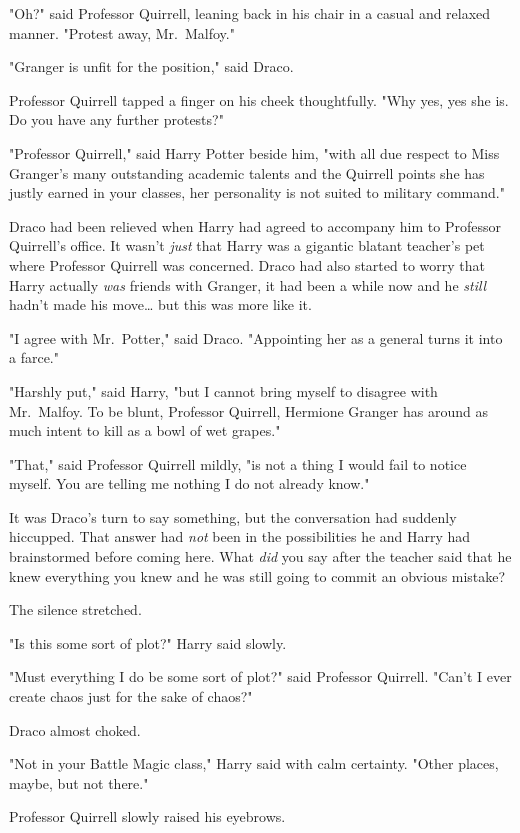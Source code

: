 "Oh?" said Professor Quirrell, leaning back in his chair in a casual and 
relaxed manner. "Protest away, Mr.~Malfoy."

"Granger is unfit for the position," said Draco.

Professor Quirrell tapped a finger on his cheek thoughtfully. "Why yes, yes she 
is. Do you have any further protests?"

"Professor Quirrell," said Harry Potter beside him, "with all due respect to 
Miss Granger's many outstanding academic talents and the Quirrell points she 
has justly earned in your classes, her personality is not suited to military 
command."

Draco had been relieved when Harry had agreed to accompany him to Professor 
Quirrell's office. It wasn't \emph{just} that Harry was a gigantic blatant 
teacher's pet where Professor Quirrell was concerned. Draco had also started to 
worry that Harry actually \emph{was} friends with Granger, it had been a while 
now and he \emph{still} hadn't made his move{\ldots} but this was more like it.

"I agree with Mr.~Potter," said Draco. "Appointing her as a general turns it 
into a farce."

"Harshly put," said Harry, "but I cannot bring myself to disagree with 
Mr.~Malfoy. To be blunt, Professor Quirrell, Hermione Granger has around as 
much intent to kill as a bowl of wet grapes."

"That," said Professor Quirrell mildly, "is not a thing I would fail to notice 
myself. You are telling me nothing I do not already know."

It was Draco's turn to say something, but the conversation had suddenly 
hiccupped. That answer had \emph{not} been in the possibilities he and Harry 
had brainstormed before coming here. What \emph{did} you say after the teacher 
said that he knew everything you knew and he was still going to commit an 
obvious mistake?

The silence stretched.

"Is this some sort of plot?" Harry said slowly.

"Must everything I do be some sort of plot?" said Professor Quirrell. "Can't I 
ever create chaos just for the sake of chaos?"

Draco almost choked.

"Not in your Battle Magic class," Harry said with calm certainty. "Other 
places, maybe, but not there."

Professor Quirrell slowly raised his eyebrows.

